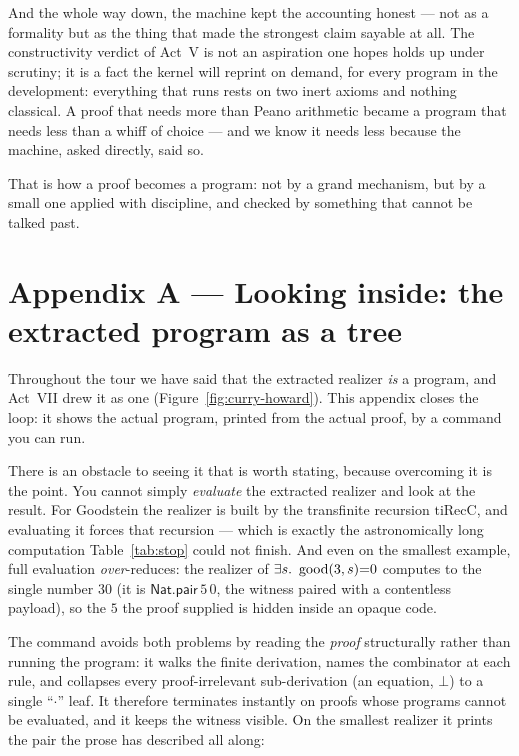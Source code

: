 \documentclass[11pt]{article}
\begin{document}
And the whole way down, the machine kept the accounting honest --- not as a
formality but as the thing that made the strongest claim sayable at all. The
constructivity verdict of Act~V is not an aspiration one hopes holds up under
scrutiny; it is a fact the kernel will reprint on demand, for every program in
the development: everything that runs rests on two inert axioms and nothing
classical. A proof that needs more than Peano arithmetic became a program that
needs less than a whiff of choice --- and we know it needs less because the
machine, asked directly, said so.

That is how a proof becomes a program: not by a grand mechanism, but by a small
one applied with discipline, and checked by something that cannot be talked past.

\appendix
\section{Appendix A --- Looking inside: the extracted program as a tree}
\label{app:xray}

Throughout the tour we have said that the extracted realizer \emph{is} a
program, and Act~VII drew it as one (Figure~\ref{fig:curry-howard}). This
appendix closes the loop: it shows the actual program, printed from the actual
proof, by a command you can run.

There is an obstacle to seeing it that is worth stating, because overcoming it is
the point. You cannot simply \emph{evaluate} the extracted realizer and look at
the result. For Goodstein the realizer is built by the transfinite recursion
$\mathrm{tiRecC}$, and evaluating it forces that recursion --- which is exactly
the astronomically long computation Table~\ref{tab:stop} could not finish. And
even on the smallest example, full evaluation \emph{over}-reduces: the realizer of
$\exists s.\ \operatorname{good}(3,s){=}0$ computes to the single number $30$ (it is
$\mathsf{Nat.pair}\,5\,0$, the witness paired with a contentless payload), so the
$5$ the proof supplied is hidden inside an opaque code.

The command  avoids both problems by reading the \emph{proof}
structurally rather than running the program: it walks the finite derivation,
names the combinator at each rule, and collapses every proof-irrelevant
sub-derivation (an equation, $\bot$) to a single ``$\cdot$'' leaf. It therefore
terminates instantly on proofs whose programs cannot be evaluated, and it keeps
the witness visible. On the smallest realizer it prints the pair the prose has
described all along:
\end{document}
